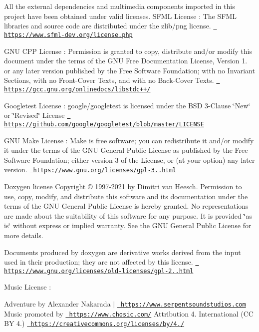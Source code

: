 All the external dependencies and multimedia components imported in this project have been obtained under valid licenses. 
 SFML License \+: The SFML libraries and source code are distributed under the zlib/png license. \href{https://www.sfml-dev.org/license.php}{\texttt{ https\+://www.\+sfml-\/dev.\+org/license.\+php}} 


GNU CPP License \+: Permission is granted to copy, distribute and/or modify this document under the terms of the GNU Free Documentation License, Version 1. or any later version published by the Free Software Foundation; with no Invariant Sections, with no Front-\/\+Cover Texts, and with no Back-\/\+Cover Texts. \href{https://gcc.gnu.org/onlinedocs/libstdc++/}{\texttt{ https\+://gcc.\+gnu.\+org/onlinedocs/libstdc++/}} 


Googletest License \+: google/googletest is licensed under the BSD 3-\/Clause \char`\"{}\+New\char`\"{} or \char`\"{}\+Revised\char`\"{} License \href{https://github.com/google/googletest/blob/master/LICENSE}{\texttt{ https\+://github.\+com/google/googletest/blob/master/\+LICENSE}} 


GNU Make License \+: Make is free software; you can redistribute it and/or modify it under the terms of the GNU General Public License as published by the Free Software Foundation; either version 3 of the License, or (at your option) any later version. \href{https://www.gnu.org/licenses/gpl-3.0.html}{\texttt{ https\+://www.\+gnu.\+org/licenses/gpl-\/3..\+html}} 


Doxygen license Copyright © 1997-\/2021 by Dimitri van Heesch. Permission to use, copy, modify, and distribute this software and its documentation under the terms of the GNU General Public License is hereby granted. No representations are made about the suitability of this software for any purpose. It is provided \char`\"{}as is\char`\"{} without express or implied warranty. See the GNU General Public License for more details.

Documents produced by doxygen are derivative works derived from the input used in their production; they are not affected by this license. \href{https://www.gnu.org/licenses/old-licenses/gpl-2.0.html}{\texttt{ https\+://www.\+gnu.\+org/licenses/old-\/licenses/gpl-\/2..\+html}} 


Music License \+:

Adventure by Alexander Nakarada $\vert$ \href{https://www.serpentsoundstudios.com}{\texttt{ https\+://www.\+serpentsoundstudios.\+com}} Music promoted by \href{https://www.chosic.com/}{\texttt{ https\+://www.\+chosic.\+com/}} Attribution 4. International (CC BY 4.) \href{https://creativecommons.org/licenses/by/4.0/}{\texttt{ https\+://creativecommons.\+org/licenses/by/4./}}

